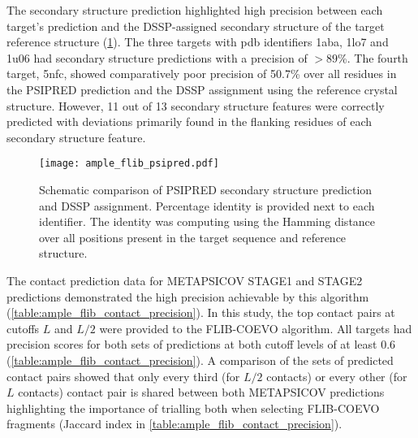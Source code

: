 The secondary structure prediction highlighted high precision between each target's prediction and the DSSP-assigned \cite{Frishman1995-si} secondary structure of the target reference structure (\cref{fig:ample_flib_psipred}). The three targets with \gls{pdb} identifiers 1aba, 1lo7 and 1u06 had secondary structure predictions with a precision of $>89$\%. The fourth target, 5nfc, showed comparatively poor precision of 50.7\% over all residues in the PSIPRED prediction and the DSSP assignment using the reference crystal structure. However, 11 out of 13 secondary structure features were correctly predicted with deviations primarily found in the flanking residues of each secondary structure feature. 

\begin{figure}[H]
	\centering
	\texttt{[image: ample\_flib\_psipred.pdf]}
	\caption[PSIPRED schema for FLIB-COEVO targets]{Schematic comparison of PSIPRED \cite{Jones1999-ed} secondary structure prediction and DSSP \cite{Frishman1995-si} assignment. Percentage identity is provided next to each identifier. The identity was computing using the Hamming distance over all positions present in the target sequence and reference structure.}
	\label{fig:ample_flib_psipred}
\end{figure}

The contact prediction data for METAPSICOV STAGE1 and STAGE2 predictions demonstrated the high precision achievable by this algorithm (\cref{table:ample_flib_contact_precision}). In this study, the top contact pairs at cutoffs $L$ and $L/2$ were provided to the FLIB-COEVO algorithm. All targets had precision scores for both sets of predictions at both cutoff levels of at least 0.6 (\cref{table:ample_flib_contact_precision}). A comparison of the sets of predicted contact pairs showed that only every third (for $L/2$ contacts) or every other (for $L$ contacts) contact pair is shared between both METAPSICOV predictions highlighting the importance of trialling both when selecting FLIB-COEVO fragments (Jaccard index in \cref{table:ample_flib_contact_precision}).

